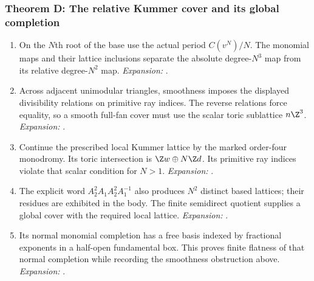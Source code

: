 \hypertarget{outline-III-D}{}
\subsubsection*{Theorem D: The relative Kummer cover and its global completion}
\begin{enumerate}[label=\arabic*.,leftmargin=*]
\item\hypertarget{step-III-D-1}{} On the $N$th root of the base use the actual period
$C(v^N)/N$.  The monomial maps and their lattice inclusions
separate the absolute degree-$N^3$ map from its relative
degree-$N^2$ map.
\textit{Expansion:} .
\item\hypertarget{step-III-D-2}{} Across adjacent unimodular triangles, smoothness imposes the
displayed divisibility relations on primitive ray indices.
The reverse relations force equality, so a smooth full-fan cover
must use the scalar toric sublattice $n\Z^3$.
\textit{Expansion:} .
\item\hypertarget{step-III-D-3}{} Continue the prescribed local Kummer lattice by the marked
order-four monodromy.  Its toric intersection is
$\Z w\oplus N\Z d$.  Its primitive ray indices violate that
scalar condition for $N>1$.
\textit{Expansion:} .
\item\hypertarget{step-III-D-4}{} The explicit word
$A_2^2A_1A_2^2A_1^{-1}$ also produces $N^2$ distinct based
lattices; their residues are exhibited in the body.  The finite
semidirect quotient supplies a global cover with the required
local lattice.
\textit{Expansion:} .
\item\hypertarget{step-III-D-5}{} Its normal monomial completion has a free basis indexed by
fractional exponents in a half-open fundamental box.  This proves
finite flatness of that normal completion while recording the
smoothness obstruction above.
\textit{Expansion:} .
\end{enumerate}

\hypertarget{outline-III-E}{}
